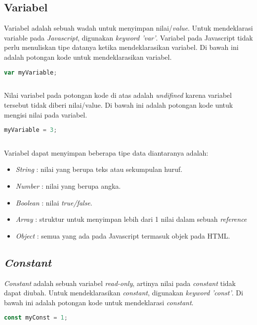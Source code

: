 \subsection{Variabel}
Variabel adalah sebuah wadah untuk menyimpan nilai/\textit{value}. Untuk mendeklarasi variable pada \textit{Javascript}, digunakan \textit{keyword 'var'}. Variabel pada Javascript tidak perlu menuliskan tipe datanya ketika mendeklarasikan variabel. Di bawah ini adalah potongan kode untuk mendeklarasikan variabel.

\begin{lstlisting}[language=Javascript, caption=Deklarasi variabel]
	var myVariable;
	
\end{lstlisting}

Nilai variabel pada potongan kode di atas adalah \textit{undifined} karena variabel tersebut tidak diberi nilai/value. Di bawah ini adalah potongan kode untuk mengisi nilai pada variabel. 

\begin{lstlisting}[language=Javascript, caption=Mengisi nilai sebuah variabel]
	myVariable = 3;	
	
\end{lstlisting}

Variabel dapat menyimpan beberapa tipe data diantaranya adalah:
\begin{itemize}
	\item \textit{String} : nilai yang berupa teks atau sekumpulan huruf.
	\item \textit{Number} : nilai yang berupa angka.
	\item \textit{Boolean} : nilai \textit{true/false}.
	\item \textit{Array} : struktur untuk menyimpan lebih dari 1 nilai dalam sebuah \textit{reference}
	\item \textit{Object} : semua yang ada pada Javascript termasuk objek pada HTML.
\end{itemize}

\subsection{\textit{Constant}}
\textit{Constant} adalah sebuah variabel \textit{read-only}, artinya nilai pada \textit{constant} tidak dapat diubah. Untuk mendeklarasikan \textit{constant}, digunakan \textit{keyword 'const'}. Di bawah ini adalah potongan kode untuk mendeklarasi \textit{constant}.

\begin{lstlisting}[language=Javascript, caption=Deklarasi \textit{constant}]
	const myConst = 1;
	
\end{lstlisting}

